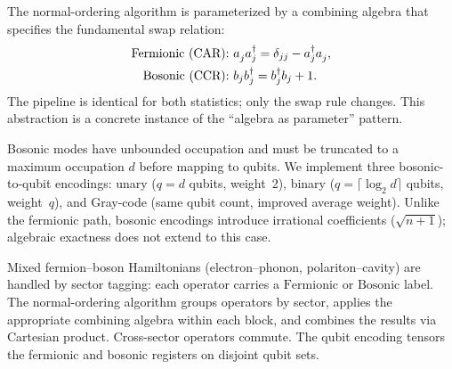 The normal-ordering algorithm is parameterized by a combining algebra
that specifies the fundamental swap relation:
\begin{align}
  \text{Fermionic (CAR):}\ & \an{j}\ad{j} = \delta_{jj} - \ad{j}\an{j},
  \label{eq:car-swap} \\
  \text{Bosonic (CCR):}\ & b_j b_j^\dagger = b_j^\dagger b_j + 1.
  \label{eq:ccr-swap}
\end{align}
The pipeline is identical for both statistics; only the swap rule
changes.  This abstraction is a concrete instance of the ``algebra as
parameter'' pattern.

Bosonic modes have unbounded occupation and must be truncated to a
maximum occupation $d$ before mapping to qubits.  We implement three
bosonic-to-qubit encodings: unary ($q = d$ qubits, weight~2), binary
($q = \lceil\log_2 d\rceil$ qubits, weight~$q$), and Gray-code
(same qubit count, improved average weight).  Unlike the fermionic
path, bosonic encodings introduce irrational coefficients
($\sqrt{n+1}$); algebraic exactness does not extend to this case.

Mixed fermion--boson Hamiltonians (electron--phonon, polariton--cavity)
are handled by sector tagging: each operator carries a
$\mathrm{Fermionic}$ or $\mathrm{Bosonic}$ label.  The normal-ordering
algorithm groups operators by sector, applies the appropriate combining
algebra within each block, and combines the results via Cartesian
product.  Cross-sector operators commute.  The qubit encoding tensors
the fermionic and bosonic registers on disjoint qubit sets.
